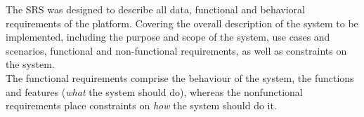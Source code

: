 

The SRS was designed to describe all data, functional and behavioral requirements of the platform. Covering the overall description of the system to be implemented, including the purpose and scope of the system, use cases and scenarios, functional and non-functional requirements, as well as constraints on the system.\\

The functional requirements comprise the behaviour of the system, the functions and features (\textit{what} the system should do), whereas the nonfunctional requirements place constraints on \textit{how} the system should do it.

